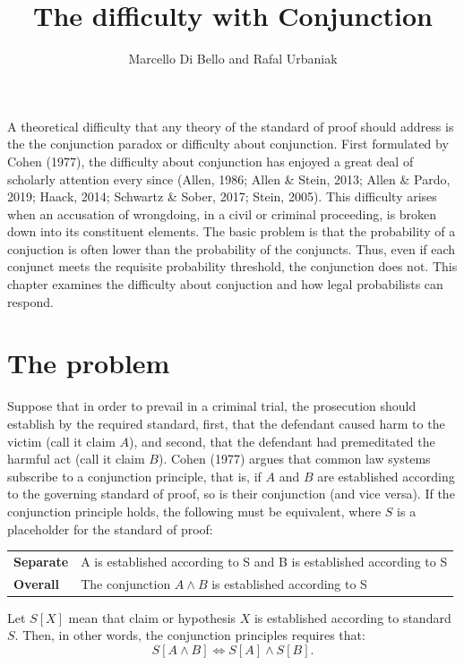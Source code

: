 \documentclass[10pt,dvipsnames,enabledeprecatedfontcommands]{scrartcl}
\title{The difficulty with Conjunction}
\author{Marcello Di Bello and Rafal Urbaniak}
\date{}
\newcommand{\et}{\wedge}
\begin{document}
\maketitle

A theoretical difficulty that any theory of the standard of proof should
address is the the conjunction paradox or difficulty about conjunction.
First formulated by Cohen (1977), the difficulty about conjunction has
enjoyed a great deal of scholarly attention every since (Allen, 1986;
Allen \& Stein, 2013; Allen \& Pardo, 2019; Haack, 2014; Schwartz \&
Sober, 2017; Stein, 2005). This difficulty arises when an accusation of
wrongdoing, in a civil or criminal proceeding, is broken down into its
constituent elements. The basic problem is that the probability of a
conjuction is often lower than the probability of the conjuncts. Thus,
even if each conjunct meets the requisite probability threshold, the
conjunction does not. This chapter examines the difficulty about
conjuction and how legal probabilists can respond.

\hypertarget{the-problem}{%
\section{The problem}\label{the-problem}}

Suppose that in order to prevail in a criminal trial, the prosecution
should establish by the required standard, first, that the defendant
caused harm to the victim (call it claim \(A\)), and second, that the
defendant had premeditated the harmful act (call it claim \(B\)). Cohen
(1977) argues that common law systems subscribe to a conjunction
principle, that is, if \(A\) and \(B\) are established according to the
governing standard of proof, so is their conjunction (and vice versa).
If the conjunction principle holds, the following must be equivalent,
where \(S\) is a placeholder for the standard of proof:

\begin{center}
\begin{tabular}
{@{}ll@{}}
\toprule
\textbf{Separate} &   A is established according to S and B is established according to S\\   
\textbf{Overall}  &   The conjunction $A \et B$ is established according to S  \\ 
\bottomrule
\end{tabular}
\end{center}

\noindent Let \(S[X]\) mean that claim or hypothesis \(X\) is
established according to standard \(S\). Then, in other words, the
conjunction principles requires that:
\[S[A \wedge B] \Leftrightarrow S[A] \wedge S[B].\]
\end{document}
